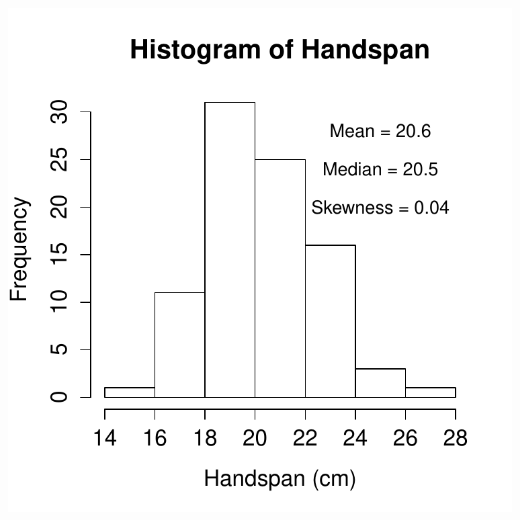 \documentclass[handout]{beamer}
\begin{document}

\begin{frame}
\centering \includegraphics[scale = 0.75]{./images/handspan_skew}


\end{frame}

\end{document}
